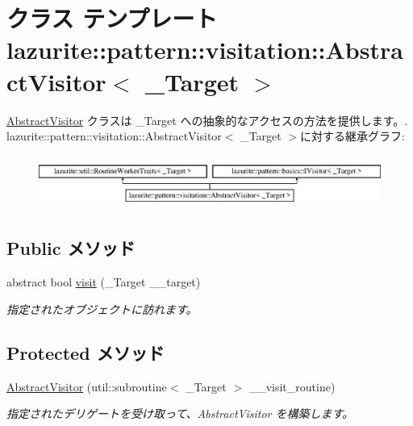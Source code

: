 \hypertarget{classlazurite_1_1pattern_1_1visitation_1_1_abstract_visitor_3_01___target_01_4}{
\section{クラス テンプレート lazurite::pattern::visitation::AbstractVisitor$<$ \_\-Target $>$}
\label{classlazurite_1_1pattern_1_1visitation_1_1_abstract_visitor_3_01___target_01_4}
}


\hyperlink{classlazurite_1_1pattern_1_1visitation_1_1_abstract_visitor}{AbstractVisitor} クラスは \_\-Target への抽象的なアクセスの方法を提供します。.  
lazurite::pattern::visitation::AbstractVisitor$<$ \_\-Target $>$に対する継承グラフ:\begin{figure}[H]
\begin{center}
\leavevmode
\includegraphics[height=1.76656cm]{classlazurite_1_1pattern_1_1visitation_1_1_abstract_visitor_3_01___target_01_4}
\end{center}
\end{figure}
\subsection*{Public メソッド}
\begin{DoxyCompactItemize}
\item 
abstract bool \hyperlink{classlazurite_1_1pattern_1_1visitation_1_1_abstract_visitor_3_01___target_01_4_a82376a3bfa3b8356c6557cf30a0c0f9d}{visit} (\_\-Target \_\-\_\-target)
\begin{DoxyCompactList}\small\item\em 指定されたオブジェクトに訪れます。 \item\end{DoxyCompactList}\end{DoxyCompactItemize}
\subsection*{Protected メソッド}
\begin{DoxyCompactItemize}
\item 
\hyperlink{classlazurite_1_1pattern_1_1visitation_1_1_abstract_visitor_3_01___target_01_4_a09251c5cb1f2a1b6c229643ce7961a6e}{AbstractVisitor} (util::subroutine$<$ \_\-Target $>$ \_\-\_\-visit\_\-routine)
\begin{DoxyCompactList}\small\item\em 指定されたデリゲートを受け取って、AbstractVisitor を構築します。 \item\end{DoxyCompactList}\end{DoxyCompactItemize}


